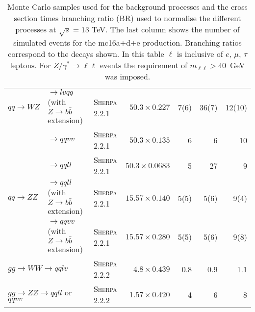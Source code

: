 \begin{table}[tbph]
{\begin{tabular}{lllrrrr}
    $qq\rightarrow WZ$ & $\rightarrow lvqq$ (with $Z\rightarrow b\bar{b}$ extension) & \textsc{Sherpa 2.2.1} & $50.3\times0.227$ & 7(6) & 36(7) & 12(10) \\
                                            & $\rightarrow qqvv$ & \textsc{Sherpa 2.2.1} & $50.3\times0.135$ & 6 & 6 & 10 \\
                                            & $\rightarrow qqll$ & \textsc{Sherpa 2.2.1} & $50.3\times0.0683$ & 5 & 27 & 9 \\
    $qq\rightarrow ZZ$ & $\rightarrow qqll$ (with $Z\rightarrow b\bar{b}$ extension) & \textsc{Sherpa 2.2.1} & $15.57\times0.140$ & 5(5)  & 5(6) & 9(4) \\
                                            & $\rightarrow qqvv$ (with $Z\rightarrow b\bar{b}$ extension) & \textsc{Sherpa 2.2.1} & $15.57\times0.280$ & 5(5)  & 5(6) & 9(8) \\
    \multicolumn{2}{l}{$gg\rightarrow WW \rightarrow qqlv$} & \textsc{Sherpa 2.2.2} & $4.8\times0.439$ & 0.8 & 0.9 & 1.1 \\
    \multicolumn{2}{l}{$gg\rightarrow ZZ \rightarrow qqll$ or $qqvv$} & \textsc{Sherpa 2.2.2} & $1.57\times0.420$ & 4 & 6 & 8 \\
    \bottomrule
  \end{tabular}
}
\caption{Monte Carlo samples used for the background processes and the cross
  section times branching ratio (BR) used to normalise the different processes
  at $\sqrt{s}=13$ TeV. The last column shows the number of simulated events for
  the {mc16a+d+e} production. Branching ratios correspond to the decays shown.
  In this table $\ell$ is inclusive of $e$, $\mu$, $\tau$ leptons. For
  $Z/\gamma^{*} \to \ell\ell$ events the requirement of $m_{\ell\ell}>40$~GeV
  was imposed.
}
\label{tab:bkgMC}
\end{table}
